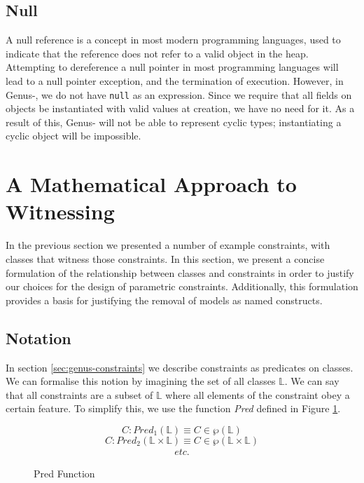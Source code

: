 \subsection{Null}

A null reference is a concept in most modern programming languages, used to indicate that the reference does not refer to a valid object in the heap. Attempting to dereference a null pointer in most programming languages will lead to a null pointer exception, and the termination of execution. However, in Genus-, we do not have \texttt{null} as an expression. Since we require that all fields on objects be instantiated with valid values at creation, we have no need for it. As a result of this, Genus- will not be able to represent cyclic types; instantiating a cyclic object will be impossible.

\newpage

\section{A Mathematical Approach to Witnessing} \label{sec:mat-wit}

In the previous section we presented a number of example constraints, with classes that witness those constraints. In this section, we present a concise  formulation of the relationship between classes and constraints in order to justify our choices for the design of parametric constraints. Additionally, this formulation provides a basis for justifying the removal of models as named constructs.

\subsection{Notation}

In section \ref{sec:genus-constraints} we describe constraints as predicates on classes. We can formalise this notion by imagining the set of all classes $\mathbb{L}$. We can say that all constraints are a subset of $\mathbb{L}$ where all elements of the constraint obey a certain feature. To simplify this, we use the function \textit{Pred} defined in Figure \ref{fig:pred}. \\

\begin{figure}[h]
    \centering
\begin{equation*}
    C : Pred_1(\mathbb{L}) \equiv C \in \wp(\mathbb{L})
\end{equation*}
\begin{equation*}
    C : Pred_2(\mathbb{L} \times \mathbb{L}) \equiv C \in \wp(\mathbb{L} \times \mathbb{L})
\end{equation*}
\begin{align*}
    \textit{etc.}
\end{align*}
    \caption{Pred Function}
    \label{fig:pred}
\end{figure}


